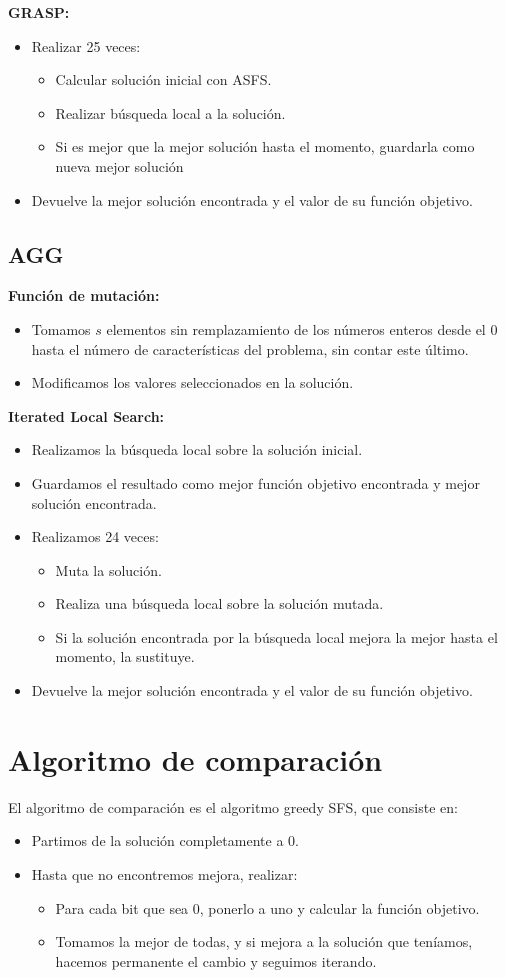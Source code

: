 \textbf{GRASP:}
\begin{itemize}
\item Realizar 25 veces:
\begin{itemize}
\item Calcular solución inicial con ASFS.
\item Realizar búsqueda local a la solución.
\item Si es mejor que la mejor solución hasta el momento, guardarla como nueva mejor solución
\end{itemize} 
\item Devuelve la mejor solución encontrada y el valor de su función objetivo.
\end{itemize} 
\newpage
\subsection{AGG}
\textbf{Función de mutación:}
\begin{itemize}
\item Tomamos $s$ elementos sin remplazamiento de los números enteros desde el 0 hasta el número de características del problema, sin contar este último.  
\item Modificamos los valores seleccionados en la solución.
\end{itemize} 

\textbf{Iterated Local Search:}
\begin{itemize}
\item Realizamos la búsqueda local sobre la solución inicial.
\item Guardamos el resultado como mejor función objetivo encontrada y mejor solución encontrada.
\item Realizamos 24 veces:
\begin{itemize}
\item Muta la solución.
\item Realiza una búsqueda local sobre la solución mutada.
\item Si la solución encontrada por la búsqueda local mejora la mejor hasta el momento, la sustituye.
\end{itemize} 
\item Devuelve la mejor solución encontrada y el valor de su función objetivo.
\end{itemize} 

\newpage
\section{Algoritmo de comparación}
El algoritmo de comparación es el algoritmo greedy SFS, que consiste en:
\begin{itemize}
\item Partimos de la solución completamente a 0.
\item Hasta que no encontremos mejora, realizar:
\begin{itemize}
\item Para cada bit que sea 0, ponerlo a uno y calcular la función objetivo.
\item Tomamos la mejor de todas, y si mejora a la solución que teníamos, hacemos permanente el cambio y seguimos iterando.
\end{itemize} 
\end{itemize} 
\newpage
